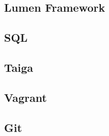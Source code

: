 \subsection{Lumen Framework}

\subsection{SQL}

\subsection{Taiga}

\subsection{Vagrant}

\subsection{Git}